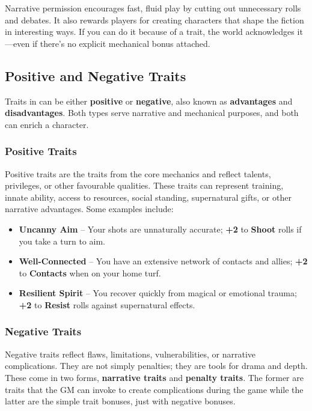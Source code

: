 Narrative permission encourages fast, fluid play by cutting out unnecessary rolls and debates. It also rewards players for creating characters that shape the fiction in interesting ways. If you can do it because of a trait, the world acknowledges it—even if there’s no explicit mechanical bonus attached.

\subsection{Positive and Negative Traits}

Traits in \wyrd can be either \textbf{positive} or \textbf{negative}, also known as \textbf{advantages} and \textbf{disadvantages}. Both types serve narrative and mechanical purposes, and both can enrich a character.

\subsubsection*{Positive Traits}

Positive traits are the traits from the core mechanics and reflect talents, privileges, or other favourable qualities. These traits can represent training, innate ability, access to resources, social standing, supernatural gifts, or other narrative advantages. Some examples include:

\begin{itemize}
    \item \textbf{Uncanny Aim} – Your shots are unnaturally accurate; \textbf{+2} to \textbf{Shoot} rolls if you take a turn to aim.
    \item \textbf{Well-Connected} – You have an extensive network of contacts and allies; \textbf{+2} to \textbf{Contacts} when on your home turf.
    \item \textbf{Resilient Spirit} – You recover quickly from magical or emotional trauma; \textbf{+2} to \textbf{Resist} rolls against supernatural effects.
\end{itemize}

\subsubsection*{Negative Traits}

Negative traits reflect flaws, limitations, vulnerabilities, or narrative complications. They are not simply penalties; they are tools for drama and depth. These come in two forms, \textbf{narrative traits} and \textbf{penalty traits}. The former are traits that the GM can invoke to create complications during the game while the latter are the simple trait bonuses, just with negative bonuses.

